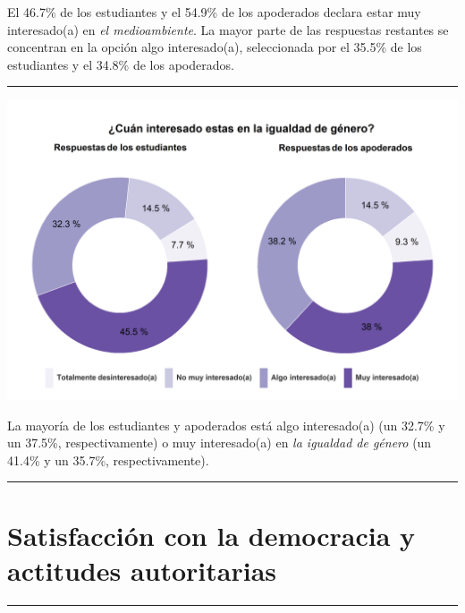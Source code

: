 \documentclass[
  14pt,
]{book}
\let\origfigure\figure
\let\endorigfigure\endfigure
\renewenvironment{figure}[1][2] {
  \expandafter\origfigure\expandafter[H]
} {
  \endorigfigure
}
\begin{document}
El 46.7\% de los estudiantes y el 54.9\% de los apoderados declara estar muy interesado(a) en \emph{el medioambiente}. La mayor parte de las respuestas restantes se concentran en la opción algo interesado(a), seleccionada por el 35.5\% de los estudiantes y el 34.8\% de los apoderados.

\begin{center}\rule{0.5\linewidth}{0.5pt}\end{center}

\begin{figure}[!ht]

{\centering \includegraphics[width=0.8\linewidth,]{images/graph_intgen} 

}

\caption{Interés en la igualdad de género}\label{fig:unnamed-chunk-40}
\end{figure}

La mayoría de los estudiantes y apoderados está algo interesado(a) (un 32.7\% y un 37.5\%, respectivamente) o muy interesado(a) en \emph{la igualdad de género} (un 41.4\% y un 35.7\%, respectivamente).

\begin{center}\rule{0.5\linewidth}{0.5pt}\end{center}

\hypertarget{satisfacciuxf3n-con-la-democracia-y-actitudes-autoritarias}{%
\section{Satisfacción con la democracia y actitudes autoritarias}\label{satisfacciuxf3n-con-la-democracia-y-actitudes-autoritarias}}

\begin{center}\rule{0.5\linewidth}{0.5pt}\end{center}
\end{document}
